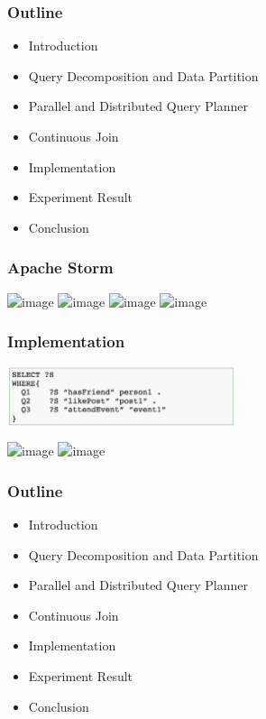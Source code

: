 \begin{frame}
\frametitle{Outline}
	\begin{itemize}
		\item Introduction
		\item Query Decomposition and Data Partition
		\item Parallel and Distributed Query Planner
		\item Continuous Join
		\item Implementation
		\item \textcolor{blue!20}{Experiment Result}
		\item \textcolor{blue!20}{Conclusion}
	\end{itemize}
\end{frame}


\begin{frame}
\frametitle{Apache Storm}
    \begin{center}
    	\includegraphics<1>[width=0.8\textwidth]{figs/storm.png}
    	\includegraphics<2>[height=0.5\textwidth]{figs/storm1.png}
    \includegraphics<3>[height=0.5\textwidth]{figs/storm2.png} 
    \includegraphics<4>[height=0.5\textwidth]{figs/storm3.png}
    \end{center}
\end{frame}

\begin{frame}
\frametitle{Implementation}
\vspace{-0.1in}
\begin{center}
\includegraphics[width=0.5\textwidth]{figs/examplequery.png}
\end{center}
\vspace{-0.2in}
    \begin{center}
    	\includegraphics<1>[width=0.8\textwidth]{figs/implementation1.png}
    	\includegraphics<2>[width=0.8\textwidth]{figs/implementation2.png}
    \end{center}
\end{frame}


\begin{frame}
\frametitle{Outline}
	\begin{itemize}
		\item Introduction
		\item Query Decomposition and Data Partition
		\item Parallel and Distributed Query Planner
		\item Continuous Join
		\item Implementation
		\item Experiment Result
		\item \textcolor{blue!20}{Conclusion}
	\end{itemize}
\end{frame}

